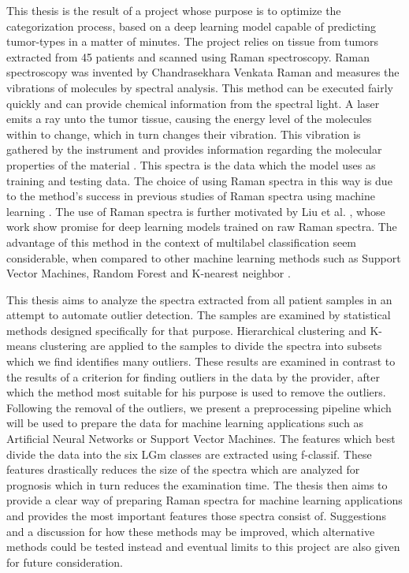 This thesis is the result of a project whose purpose is to optimize the categorization process, based on a deep learning model capable of predicting tumor-types in a matter of minutes. The project relies on tissue from tumors extracted from 45 patients and scanned using Raman spectroscopy. Raman spectroscopy was invented by Chandrasekhara Venkata Raman and measures the vibrations of molecules by spectral analysis. This method can be executed fairly quickly and can provide chemical information from the spectral light. A laser emits a ray unto the tumor tissue, causing the energy level of the molecules within to change, which in turn changes their vibration. This vibration is gathered by the instrument and provides information regarding the molecular properties of the material \cite{long1977raman, graves1989practical}. This spectra is the data which the model uses as training and testing data. The choice of using Raman spectra in this way is due to the method's success in previous studies of Raman spectra using machine learning \cite{ramanDL, ho2019rapid}. The use of Raman spectra is further motivated by Liu et al. \cite{liu2017deep}, whose work show promise for deep learning models trained on raw Raman spectra. The advantage of this method in the context of multilabel classification seem considerable, when compared to other machine learning methods such as Support Vector Machines, Random Forest and K-nearest neighbor \cite{liu2017deep}.

This thesis aims to analyze the spectra extracted from all patient samples in an attempt to automate outlier detection. The samples are examined by statistical methods designed specifically for that purpose. Hierarchical clustering and K-means clustering are applied to the samples to divide the spectra into subsets which we find identifies many outliers. These results are examined in contrast to the results of a criterion for finding outliers in the data by the provider, after which the method most suitable for his purpose is used to remove the outliers. Following the removal of the outliers, we present a preprocessing pipeline which will be used to prepare the data for machine learning applications such as Artificial Neural Networks or Support Vector Machines. The features which best divide the data into the six LGm classes are extracted using f-classif. These features drastically reduces the size of the spectra which are analyzed for prognosis which in turn reduces the examination time. The thesis then aims to provide a clear way of preparing Raman spectra for machine learning applications and provides the most important features those spectra consist of. Suggestions and a discussion for how these methods may be improved, which alternative methods could be tested instead and eventual limits to this project are also given for future consideration.

